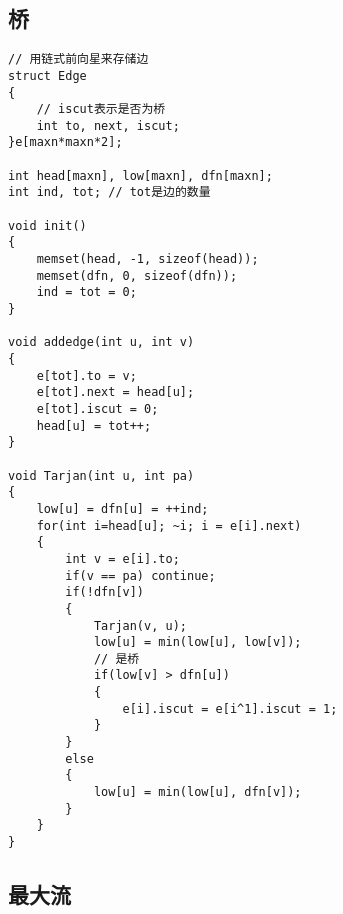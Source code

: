 \subsection{桥}
\begin{lstlisting}
// 用链式前向星来存储边
struct Edge
{
	// iscut表示是否为桥
	int to, next, iscut;
}e[maxn*maxn*2];

int head[maxn], low[maxn], dfn[maxn];
int ind, tot; // tot是边的数量

void init()
{
	memset(head, -1, sizeof(head));
	memset(dfn, 0, sizeof(dfn));
	ind = tot = 0;
}

void addedge(int u, int v)
{
	e[tot].to = v;
	e[tot].next = head[u];
	e[tot].iscut = 0;
	head[u] = tot++;
}

void Tarjan(int u, int pa)
{
	low[u] = dfn[u] = ++ind;
	for(int i=head[u]; ~i; i = e[i].next)
	{
		int v = e[i].to;
		if(v == pa) continue;
		if(!dfn[v])
		{
			Tarjan(v, u);
			low[u] = min(low[u], low[v]);
			// 是桥
			if(low[v] > dfn[u])
			{
				e[i].iscut = e[i^1].iscut = 1;
			}
		}
		else
		{
			low[u] = min(low[u], dfn[v]);
		}
	}
}
\end{lstlisting}


\subsection{最大流}
